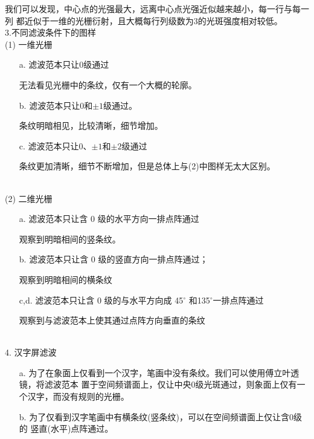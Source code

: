 \documentclass{ctexart}
\begin{document}
我们可以发现，中心点的光强最大，远离中心点光强近似越来越小，每一行与每一列
都近似于一维的光栅衍射，且大概每行列级数为3的光斑强度相对较低。
\\
3.不同滤波条件下的图样
\\
(1) 一维光栅
\begin{itemize}
	\item[a.] 滤波范本只让0级通过 \par
	无法看见光栅中的条纹，仅有一个大概的轮廓。
	\item[b.] 滤波范本只让0和$\pm1$级通过。 \par
	条纹明暗相见，比较清晰，细节增加。
	\item[c.] 滤波范本只让0、$\pm1$和$\pm2$级通过 \par
	条纹更加清晰，细节不断增加，但是总体上与(2)中图样无太大区别。
\end{itemize}
\leavevmode \\
(2) 二维光栅
\begin{itemize}
	\item [a.] 滤波范本只让含 0 级的水平方向一排点阵通过 \par
	观察到明暗相间的竖条纹。
	\item [b.] 滤波范本只让含 0 级的竖直方向一排点阵通过；\par 
	观察到明暗相间的横条纹
	\item [c,d.] 滤波范本只让含 0 级的与水平方向成 45$^\circ$ 和135$^\circ$一排点阵通过 \par
	观察到与滤波范本上使其通过点阵方向垂直的条纹
\end{itemize}
\leavevmode
\\
4. 汉字屏滤波 
\begin{itemize}
	\item [a.] 为了在象面上仅看到一个汉字，笔画中没有条纹。我们可以使用傅立叶透镜，将滤波范本
	置于空间频谱面上，仅让中央0级光斑通过，则象面上仅有一个汉字，而没有规则的光栅。
	\item [b.] 为了仅看到汉字笔画中有横条纹(竖条纹)，可以在空间频谱面上仅让含0级的
	竖直(水平)点阵通过。
\end{itemize}
\end{document}
